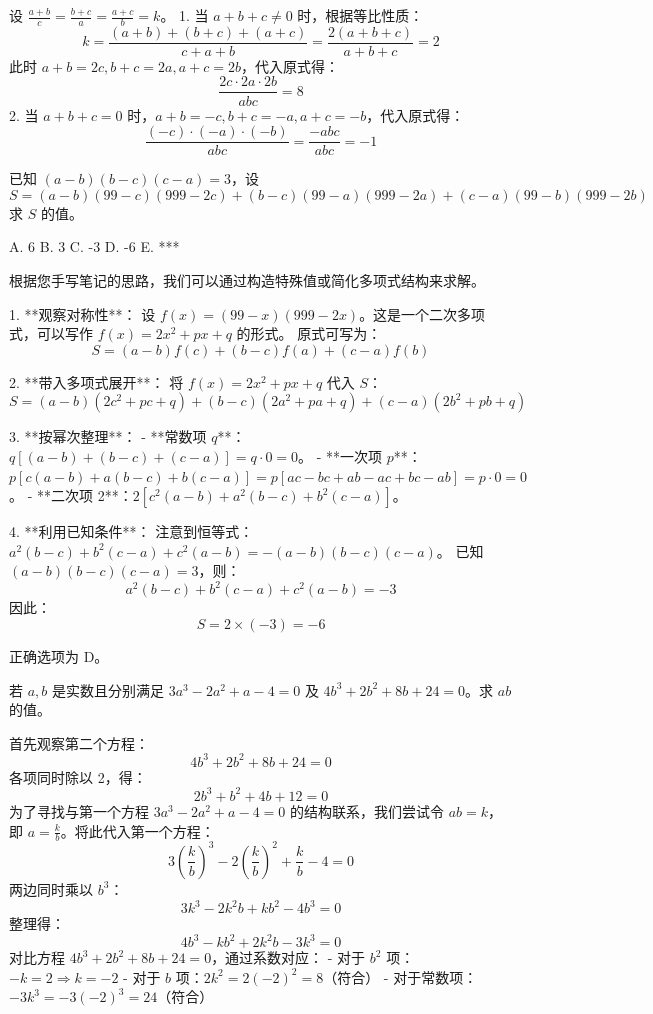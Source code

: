 \begin{questions}
\begin{solution}
设 $\frac{a+b}{c} = \frac{b+c}{a} = \frac{a+c}{b} = k$。
1. 当 $a+b+c \neq 0$ 时，根据等比性质：
\[
k = \frac{(a+b)+(b+c)+(a+c)}{c+a+b} = \frac{2(a+b+c)}{a+b+c} = 2
\]
此时 $a+b=2c, b+c=2a, a+c=2b$，代入原式得：
\[
\frac{2c \cdot 2a \cdot 2b}{abc} = 8
\]
2. 当 $a+b+c = 0$ 时，$a+b=-c, b+c=-a, a+c=-b$，代入原式得：
\[
\frac{(-c) \cdot (-a) \cdot (-b)}{abc} = \frac{-abc}{abc} = -1
\]
\end{solution}

    \question 已知 $(a-b)(b-c)(c-a) = 3$，设
\[ S = (a-b)(99-c)(999-2c) + (b-c)(99-a)(999-2a) + (c-a)(99-b)(999-2b) \]
求 $S$ 的值。

A. 6 \quad B. 3 \quad C. -3 \quad D. -6 \quad E. ***

\begin{solution}
根据您手写笔记的思路，我们可以通过构造特殊值或简化多项式结构来求解。

1. **观察对称性**：
   设 $f(x) = (99-x)(999-2x)$。这是一个二次多项式，可以写作 $f(x) = 2x^2 + px + q$ 的形式。
   原式可写为：
   \[ S = (a-b)f(c) + (b-c)f(a) + (c-a)f(b) \]

2. **带入多项式展开**：
   将 $f(x) = 2x^2 + px + q$ 代入 $S$：
   \[ S = (a-b)(2c^2 + pc + q) + (b-c)(2a^2 + pa + q) + (c-a)(2b^2 + pb + q) \]
   
3. **按幂次整理**：
   - **常数项 $q$**：$q[(a-b) + (b-c) + (c-a)] = q \cdot 0 = 0$。
   - **一次项 $p$**：$p[c(a-b) + a(b-c) + b(c-a)] = p[ac - bc + ab - ac + bc - ab] = p \cdot 0 = 0$。
   - **二次项 2**：$2[c^2(a-b) + a^2(b-c) + b^2(c-a)]$。

4. **利用已知条件**：
   注意到恒等式：$a^2(b-c) + b^2(c-a) + c^2(a-b) = -(a-b)(b-c)(c-a)$。
   已知 $(a-b)(b-c)(c-a) = 3$，则：
   \[ a^2(b-c) + b^2(c-a) + c^2(a-b) = -3 \]
   因此：
   \[ S = 2 \times (-3) = -6 \]

正确选项为 D。
\end{solution}

    \question 若 $a, b$ 是实数且分别满足 $3a^3 - 2a^2 + a - 4 = 0$ 及 $4b^3 + 2b^2 + 8b + 24 = 0$。求 $ab$ 的值。
\begin{solution}
首先观察第二个方程：
\[
4b^3 + 2b^2 + 8b + 24 = 0
\]
各项同时除以 2，得：
\[
2b^3 + b^2 + 4b + 12 = 0
\]
为了寻找与第一个方程 $3a^3 - 2a^2 + a - 4 = 0$ 的结构联系，我们尝试令 $ab = k$，即 $a = \frac{k}{b}$。将此代入第一个方程：
\[
3\left(\frac{k}{b}\right)^3 - 2\left(\frac{k}{b}\right)^2 + \frac{k}{b} - 4 = 0
\]
两边同时乘以 $b^3$：
\[
3k^3 - 2k^2b + kb^2 - 4b^3 = 0
\]
整理得：
\[
4b^3 - kb^2 + 2k^2b - 3k^3 = 0
\]
对比方程 $4b^3 + 2b^2 + 8b + 24 = 0$，通过系数对应：
- 对于 $b^2$ 项：$-k = 2 \Rightarrow k = -2$
- 对于 $b$ 项：$2k^2 = 2(-2)^2 = 8$（符合）
- 对于常数项：$-3k^3 = -3(-2)^3 = 24$（符合）


\end{solution}
\end{questions}
